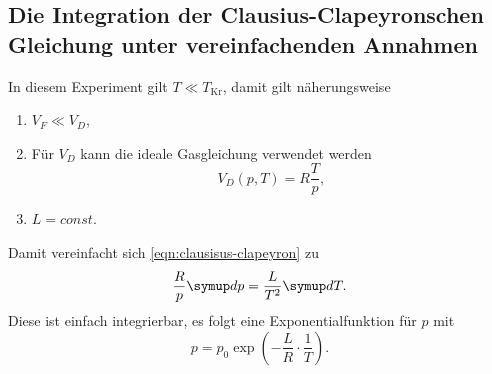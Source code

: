 \subsection{Die Integration der Clausius-Clapeyronschen Gleichung unter vereinfachenden
Annahmen}
\label{sec:Die Integration der Clausius-Clapeyronschen Gleichung unter vereinfachenden
Annahmen}
In diesem Experiment gilt $T \ll T_\text{Kr}$, damit gilt näherungsweise
\begin{enumerate}
	\item $V_F \ll V_D$,
	\item Für $V_D$ kann die ideale Gasgleichung verwendet werden
		\[
			V_D(p, T) = R \frac{T}{p},
		\]
	\item $L = const.$
\end{enumerate}
Damit vereinfacht sich \autoref{eqn:clausisus-clapeyron} zu
\[
	\frac{R}{p} \symup dp = \frac{L}{T^2} \symup dT.
\]
Diese ist einfach integrierbar, es folgt eine Exponentialfunktion für $p$ mit
\[
	p = p_0 \exp\left( -\frac{L}{R} \cdot \frac{1}{T} \right).
\]

